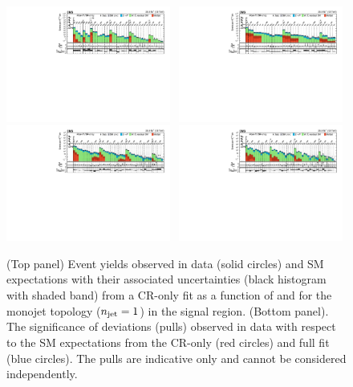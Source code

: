 \clearpage
\begin{figure}[!t]
  \centering
  \begin{center}
    \caption{(Top panel) Event yields observed in data (solid circles)
      and SM expectations with their associated uncertainties (black
      histogram with shaded band) from a CR-only fit as a function of
      \nb and \scalht for the monojet topology ($n_{\text{jet}} = 1$) in the
      signal region. (Bottom panel). The significance of deviations
      (pulls) observed in data with respect to the SM expectations
      from the CR-only (red circles) and full fit (blue circles). The
      pulls are indicative only and cannot be considered
      independently.}
    \includegraphics[width=0.48\textwidth, trim=10 0 60 10, clip=true]{figures/1jet_cr-only.pdf}~ 
    \includegraphics[width=0.48\textwidth, trim=10 0 60 10, clip=true]{figures/2jet_cr-only.pdf}\\
    \includegraphics[width=0.48\textwidth, trim=10 0 60 10, clip=true]{figures/3jet_cr-only.pdf}~
    \includegraphics[width=0.48\textwidth, trim=10 0 60 10, clip=true]{figures/4jet_cr-only.pdf}\\

\end{center}
\end{figure}

